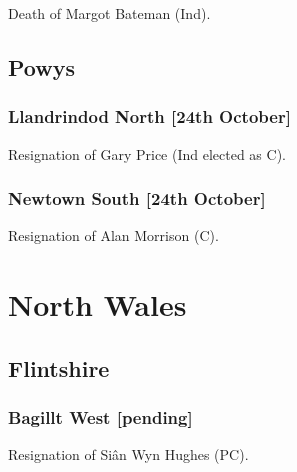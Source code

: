 \documentclass[a4paper,openany]{book}
\begin{document}
\begin{resultsiii}

Death of Margot Bateman (Ind).

\subsection*{Powys}

\subsubsection*{Llandrindod North \hspace*{\fill}\nolinebreak[1]%
	\enspace\hspace*{\fill}
	[24th October]}


Resignation of Gary Price (Ind elected as C).

\subsubsection*{Newtown South \hspace*{\fill}\nolinebreak[1]%
	\enspace\hspace*{\fill}
	[24th October]}


Resignation of Alan Morrison (C).

\section{North Wales}

\subsection*{Flintshire}

\subsubsection*{Bagillt West \hspace*{\fill}\nolinebreak[1]%
	\enspace\hspace*{\fill}
	[pending]}


Resignation of Siân Wyn Hughes (PC).


\end{resultsiii}
\end{document}
